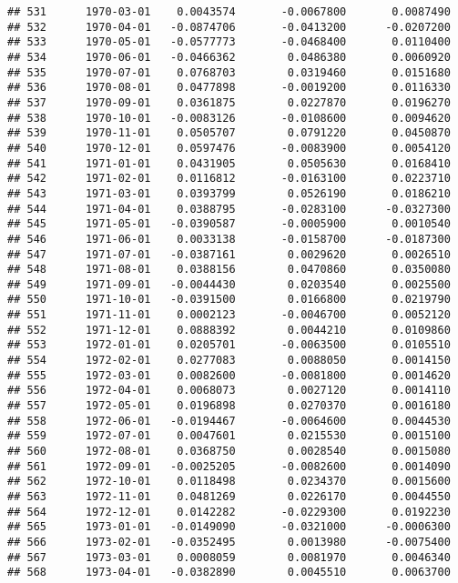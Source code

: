 \documentclass[
]{article}
\begin{document}
\begin{verbatim}
## 531      1970-03-01    0.0043574       -0.0067800       0.0087490
## 532      1970-04-01   -0.0874706       -0.0413200      -0.0207200
## 533      1970-05-01   -0.0577773       -0.0468400       0.0110400
## 534      1970-06-01   -0.0466362        0.0486380       0.0060920
## 535      1970-07-01    0.0768703        0.0319460       0.0151680
## 536      1970-08-01    0.0477898       -0.0019200       0.0116330
## 537      1970-09-01    0.0361875        0.0227870       0.0196270
## 538      1970-10-01   -0.0083126       -0.0108600       0.0094620
## 539      1970-11-01    0.0505707        0.0791220       0.0450870
## 540      1970-12-01    0.0597476       -0.0083900       0.0054120
## 541      1971-01-01    0.0431905        0.0505630       0.0168410
## 542      1971-02-01    0.0116812       -0.0163100       0.0223710
## 543      1971-03-01    0.0393799        0.0526190       0.0186210
## 544      1971-04-01    0.0388795       -0.0283100      -0.0327300
## 545      1971-05-01   -0.0390587       -0.0005900       0.0010540
## 546      1971-06-01    0.0033138       -0.0158700      -0.0187300
## 547      1971-07-01   -0.0387161        0.0029620       0.0026510
## 548      1971-08-01    0.0388156        0.0470860       0.0350080
## 549      1971-09-01   -0.0044430        0.0203540       0.0025500
## 550      1971-10-01   -0.0391500        0.0166800       0.0219790
## 551      1971-11-01    0.0002123       -0.0046700       0.0052120
## 552      1971-12-01    0.0888392        0.0044210       0.0109860
## 553      1972-01-01    0.0205701       -0.0063500       0.0105510
## 554      1972-02-01    0.0277083        0.0088050       0.0014150
## 555      1972-03-01    0.0082600       -0.0081800       0.0014620
## 556      1972-04-01    0.0068073        0.0027120       0.0014110
## 557      1972-05-01    0.0196898        0.0270370       0.0016180
## 558      1972-06-01   -0.0194467       -0.0064600       0.0044530
## 559      1972-07-01    0.0047601        0.0215530       0.0015100
## 560      1972-08-01    0.0368750        0.0028540       0.0015080
## 561      1972-09-01   -0.0025205       -0.0082600       0.0014090
## 562      1972-10-01    0.0118498        0.0234370       0.0015600
## 563      1972-11-01    0.0481269        0.0226170       0.0044550
## 564      1972-12-01    0.0142282       -0.0229300       0.0192230
## 565      1973-01-01   -0.0149090       -0.0321000      -0.0006300
## 566      1973-02-01   -0.0352495        0.0013980      -0.0075400
## 567      1973-03-01    0.0008059        0.0081970       0.0046340
## 568      1973-04-01   -0.0382890        0.0045510       0.0063700

\end{verbatim}
\end{document}
